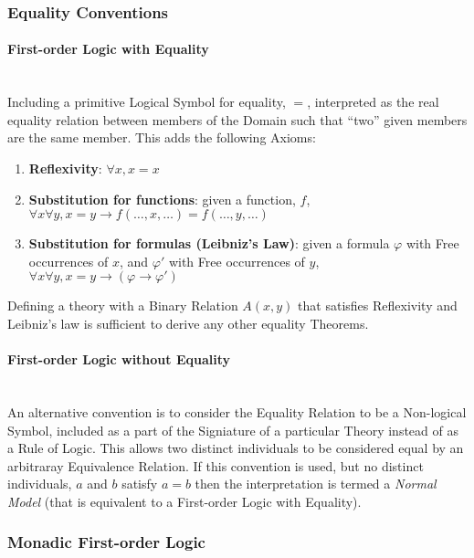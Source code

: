 \documentclass{article}
\begin{document}
\subsubsection{Equality Conventions}\label{subsec:firstorder_equality}

\paragraph{First-order Logic with Equality}\hfill
\\ Including a primitive Logical Symbol for equality, $=$, interpreted
as the real equality relation between members of the Domain such that
``two'' given members are the same member. This adds the following
Axioms:

\begin{enumerate}
\item \textbf{Reflexivity}: $\forall x, x=x$
\item \textbf{Substitution for functions}: given a function, $f$,
  $\forall x \forall y, x = y \rightarrow f(\ldots,x,\ldots) =
  f(\ldots,y,\ldots)$
\item \textbf{Substitution for formulas (Leibniz's Law)}: given a
  formula $\varphi$ with Free occurrences of $x$, and $\varphi '$ with
  Free occurrences of $y$, $\forall x \forall y, x = y \rightarrow
  (\varphi \rightarrow \varphi ')$
\end{enumerate}

Defining a theory with a Binary Relation $A(x,y)$ that satisfies
Reflexivity and Leibniz's law is sufficient to derive any other
equality Theorems.

\paragraph{First-order Logic without Equality} \hfill
\\ An alternative convention is to consider the Equality Relation to
be a Non-logical Symbol, included as a part of the Signiature of a
particular Theory instead of as a Rule of Logic. This allows two
distinct individuals to be considered equal by an arbitraray
Equivalence Relation. If this convention is used, but no distinct
individuals, $a$ and $b$ satisfy $a=b$ then the interpretation is
termed a \emph{Normal Model} (that is equivalent to a First-order
Logic with Equality).


\subsubsection{Monadic First-order Logic}
\end{document}

